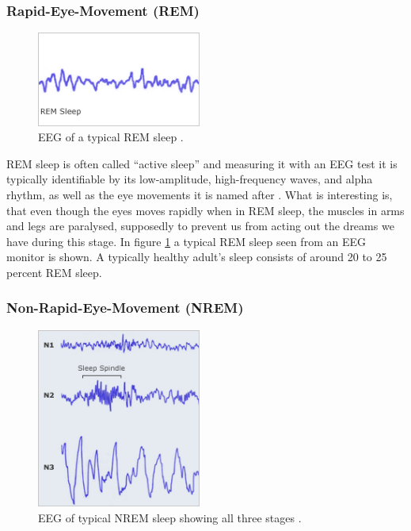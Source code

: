 \documentclass[12pt]{article} %
\begin{document}
\subsubsection{Rapid-Eye-Movement (REM)}
\begin{figure}
  \begin{center}
    \includegraphics[width=0.48\textwidth]{rem}
  \end{center}
  \caption{EEG of a typical REM sleep \cite{harvard}.}
  \label{fig:rem}
\end{figure}

REM sleep is often called ``active sleep'' and measuring it with an EEG test it is typically identifiable by its low-amplitude, high-frequency waves, and alpha rhythm, as well as the eye movements it is named after \cite{harvard}. What is interesting is, that even though the eyes moves rapidly when in REM sleep, the muscles in arms and legs are paralysed, supposedly to prevent us from acting out the dreams we have during this stage. In figure \ref{fig:rem} a typical REM sleep seen from an EEG monitor is shown. A typically healthy adult's sleep consists of around 20 to 25 percent REM sleep. 

\subsubsection{Non-Rapid-Eye-Movement (NREM)}
\begin{figure}
  \begin{center}
    \includegraphics[width=0.48\textwidth]{nrem}
  \end{center}
  \caption{EEG of typical NREM sleep showing all three stages \cite{harvard}.}
  \label{fig:nrem}
\end{figure}
\end{document}

